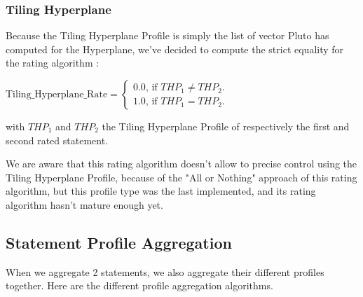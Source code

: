 \documentclass[paper=a4, fontsize=11pt]{scrartcl}
\numberwithin{equation}{section}        %
\numberwithin{figure}{section}          %
\numberwithin{table}{section}               %
\begin{document}
        \subsubsection{Tiling Hyperplane}
            Because the Tiling Hyperplane Profile is simply the list of vector
            Pluto has computed for the Hyperplane, we've decided to compute the strict
            equality for the rating algorithm : 
            \begin{center}
                $ \mathrm{Tiling\_Hyperplane\_Rate} =  \left \{
                    \begin{array}{c}
                        0.0\text{, if } \mathit{THP}_1 \neq \mathit{THP}_2. \\
                        1.0\text{, if } \mathit{THP}_1 = \mathit{THP}_2.
                    \end{array} \right.$
            \end{center}
            with $\mathit{THP}_1$ and $\mathit{THP}_2$ the Tiling Hyperplane Profile of 
            respectively the first and second rated statement.

            We are aware that this rating algorithm doesn't allow to precise control using the
            Tiling Hyperplane Profile, because of the "All or Nothing" approach of this
            rating algorithm, but this profile type was the last implemented, and its rating
            algorithm hasn't mature enough yet.

    \subsection{Statement Profile Aggregation}
        When we aggregate 2 statements, we also aggregate their different profiles together.
        Here are the different profile aggregation algorithms.
\end{document}
